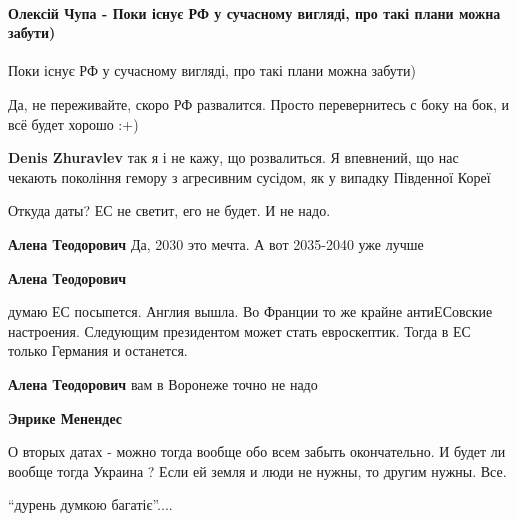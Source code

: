  
 
 
 
 
\paragraph{Олексій Чупа - Поки існує РФ у сучасному вигляді, про такі плани можна забути)}

\begin{itemize} %
Поки існує РФ у сучасному вигляді, про такі плани можна забути)

\begin{itemize} %
Да, не переживайте, скоро РФ развалится. Просто перевернитесь с боку на бок, и всё будет хорошо :+)

\textbf{Denis Zhuravlev} так я і не кажу, що розвалиться. Я впевнений, що нас чекають покоління гемору з агресивним сусідом, як у випадку Південної Кореї
\end{itemize} %

Откуда даты? ЕС не светит, его не будет. И не надо.

\begin{itemize} %
\textbf{Алена Теодорович} Да, 2030 это мечта. А вот 2035-2040 уже лучше

\textbf{Алена Теодорович} 

думаю ЕС посыпется. Англия вышла. Во Франции то же крайне антиЕСовские
настроения. Следующим президентом может стать евроскептик. Тогда в ЕС только
Германия и останется.

\textbf{Алена Теодорович} вам в Воронеже точно не надо

\textbf{Энрике Менендес} 

О вторых датах - можно тогда вообще обо всем забыть окончательно. И будет ли
вообще тогда Украина ? Если ей земля и люди не нужны, то другим нужны. Все.

\end{itemize} %

\enquote{дурень думкою багатіє}....


\end{itemize}
